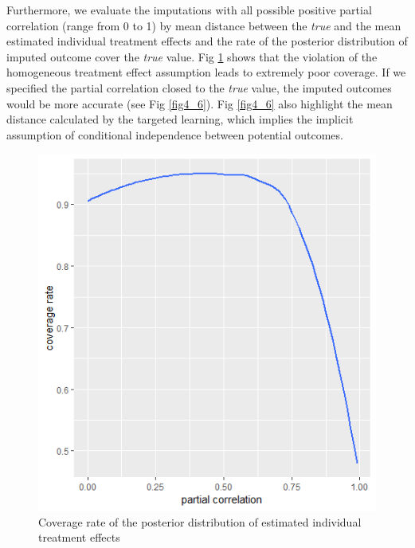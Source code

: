 	Furthermore, we evaluate the imputations with all possible positive partial correlation (range from 0 to 1) by mean distance between the \emph{true} and the mean estimated individual treatment effects and the rate of the posterior distribution of imputed outcome cover the \emph{true} value. Fig \ref{fig4_5} shows that the violation of the homogeneous treatment effect assumption leads to extremely poor coverage. If we specified the partial correlation closed to the \emph{true} value, the imputed outcomes would be more accurate (see Fig \ref{fig4_6}). Fig \ref{fig4_6} also highlight the mean distance calculated by the targeted learning, which implies the implicit assumption of conditional independence between potential outcomes. 
	\begin{figure}[ht!]
		\centering
		\includegraphics{plots/ICE.COVER} 
		\caption{Coverage rate of the posterior distribution of estimated individual treatment effects}
		\label{fig4_5}
	\end{figure}
